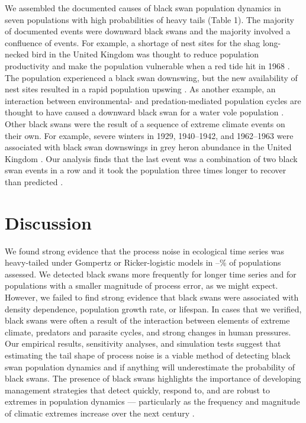 We assembled the documented causes of black swan population dynamics in seven
populations with high probabilities of heavy tails (Table 1). The majority of
documented events were downward black swans and the majority involved
a confluence of events. For example, a shortage of nest sites for the shag
long-necked bird in the United Kingdom was thought to reduce population
productivity and make the population vulnerable when a red tide hit in 1968
\citep{potts1980}. The population experienced a black swan downswing, but the
new availability of nest sites resulted in a rapid population upswing
\citep{potts1980}. As another example, an interaction between environmental-
and predation-mediated population cycles are thought to have caused a downward
black swan for a water vole population \citep{saucy1994}. Other black swans
were the result of a sequence of extreme climate events on their own. For
example, severe winters in 1929, 1940--1942, and 1962--1963 were associated
with black swan downswings in grey heron abundance in the United Kingdom
\citep{stafford1971}. Our analysis finds that the last event was a combination
of two black swan events in a row and it took the population three times longer
to recover than predicted \citep{stafford1971}.

\section{Discussion}

We found strong evidence that the process noise in ecological time series was
heavy-tailed under  Gompertz or Ricker-logistic models in
\overallMinPerc--\overallMaxPerc\% of populations assessed. We detected black
swans more frequently for longer time series and for populations with a smaller
magnitude of process error, as we might expect. However, we failed to find
strong evidence that black swans were associated with density dependence,
population growth rate, or lifespan. In cases that we verified, black swans
were often a result of the interaction between elements of extreme climate,
predators and parasite cycles, and strong changes in human pressures. Our
empirical results, sensitivity analyses, and simulation tests suggest that
estimating the tail shape of process noise is a viable method of detecting
black swan population dynamics and if anything will underestimate the
probability of black swans. The presence of black swans highlights the
importance of developing management strategies that detect quickly, respond to,
and are robust to extremes in population dynamics --- particularly as the
frequency and magnitude of climatic extremes increase over the next century
\citep{easterling2000,ipcc2012}.

